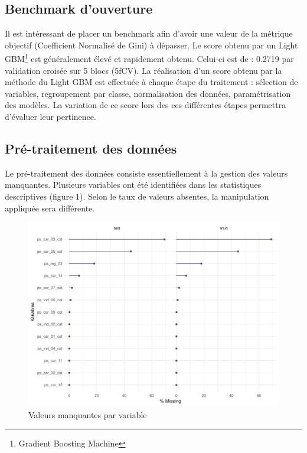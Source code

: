 \documentclass[french]{article}
\begin{document}
\begin{multicols}{2}
\subsection{Benchmark d'ouverture}

Il est intéressant de placer un benchmark afin d'avoir une valeur de la métrique objectif (Coefficient Normalisé de Gini) à dépasser. Le score obtenu par un Light GBM\footnote{Gradient Boosting Machine} est généralement élevé et rapidement obtenu. Celui-ci est de : 0.2719 par validation croisée sur 5 blocs (5fCV). La réalisation d'un score obtenu par la méthode du Light GBM est effectuée à chaque étape du traitement : sélection de variables, regroupement par classe, normalisation des données, paramétrisation des modèles. La variation de ce score lors des ces différentes étapes permettra d'évaluer leur pertinence. 


\subsection{Pré-traitement des données}

Le pré-traitement des données consiste essentiellement à la gestion des valeurs manquantes. Plusieurs variables ont été identifiées dans les statistiques descriptives (figure 1). Selon le taux de valeurs absentes, la manipulation appliquée sera différente. 

\begin{figure}[H] \centering
  \includegraphics[width = \columnwidth]{img/missing_values}
  \caption{Valeurs manquantes par variable}
\end{figure}


\end{multicols}
\end{document}

